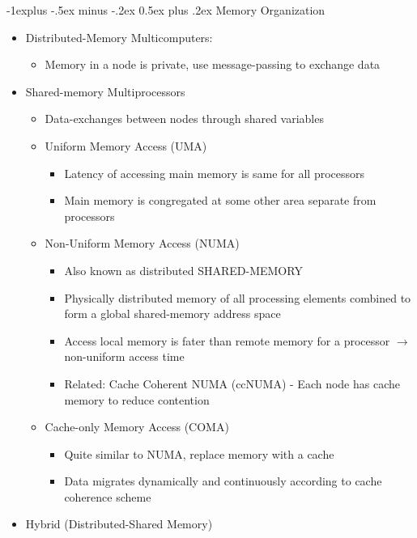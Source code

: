 \documentclass[8pt,landscape]{article}
\makeatletter
\renewcommand{\subsection}{\@startsection{subsection}{2}{0mm}%
                                {-1explus -.5ex minus -.2ex}%
                                {0.5ex plus .2ex}%
                                {\normalfont\normalsize\bfseries}}
\makeatother
\begin{document}
\begin{multicols}{3}
\subsection{Memory Organization}
\begin{itemize}
	\item Distributed-Memory Multicomputers: 		
		\begin{itemize}[label=$\ast$]
			\item Memory in a node is private, use message-passing to exchange data
		\end{itemize}
	\item Shared-memory Multiprocessors
		\begin{itemize}[label=$\ast$]
			\item Data-exchanges between nodes through shared variables
		\end{itemize}
		\begin{itemize}[label=$\circ$]
			\item Uniform Memory Access (UMA)
				\begin{itemize}[label=$\ast$]
					\item Latency of accessing main memory is same for all processors
					\item Main memory is congregated at some other area separate from processors
				\end{itemize}
			\item Non-Uniform Memory Access (NUMA)		
				\begin{itemize}[label=$\ast$]
					\item Also known as distributed SHARED-MEMORY
					\item Physically distributed memory of all processing elements combined to form a global shared-memory address space
					\item Access local memory is fater than remote memory for a processor $\rightarrow$ non-uniform access time
					\item Related: Cache Coherent NUMA (ccNUMA) - Each node has cache memory to reduce contention
				\end{itemize}
			\item Cache-only Memory Access (COMA)
				\begin{itemize}[label=$\ast$]
					\item Quite similar to NUMA, replace memory with a cache
					\item Data migrates dynamically and continuously according to cache coherence scheme
				\end{itemize}
		\end{itemize}
	\item Hybrid (Distributed-Shared Memory)
\end{itemize}


\end{multicols}
\end{document}
